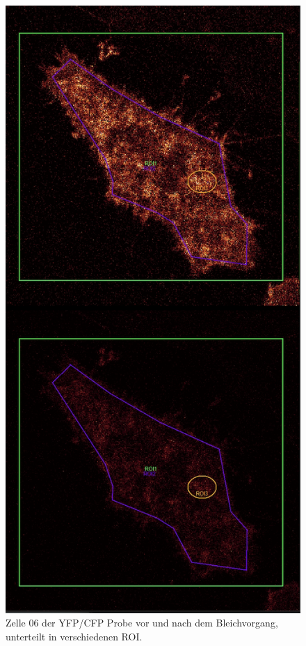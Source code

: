 \begin{figure}[h]
    \centering
    \includegraphics[scale=0.5]{Bilder/Auswertung_Anna/beispiel.PNG}
    \caption{Zelle 06 der YFP/CFP Probe vor und nach dem Bleichvorgang, unterteilt in verschiedenen ROI.}
    \label{fig:Beispeil}
   \end{figure}
